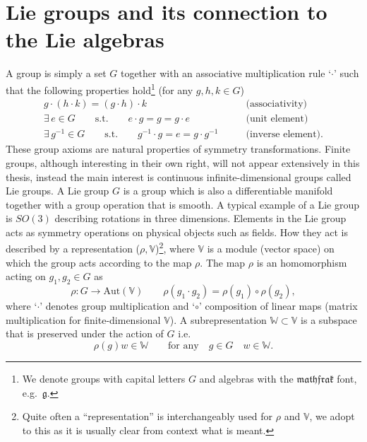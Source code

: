 \section{Lie groups and its connection to the Lie algebras}\label{sec:groups}
A group is simply a set $G$ together with an associative multiplication rule `$\cdot$' such that the following properties hold\footnote{We denote groups with capital letters $G$ and algebras with the $\mathfrak{mathfrak}$ font, e.g.\ $\mathfrak{g}$.} (for any $g,h,k\in G$)
\begin{align*}
    g\cdot \left(h\cdot k\right) = \left(g\cdot h\right)\cdot k \qquad &\text{(associativity)}\\
    \exists\, e \in G \qquad \text{s.t.} \qquad e\cdot g = g = g \cdot e\qquad &\text{(unit element)}\\
    \exists\, g^{-1}\in G\qquad \text{s.t.}\qquad g^{-1}\cdot g = e = g\cdot g^{-1} \qquad &\text{(inverse element)}.
\end{align*}
These group axioms are natural properties of symmetry transformations. Finite groups, although interesting in their own right, will not appear extensively in this thesis, instead the main interest is continuous infinite-dimensional groups called Lie groups. A Lie group $G$ is a group which is also a differentiable manifold together with a group operation that is smooth. A typical example of a Lie group is $SO(3)$ describing rotations in three dimensions. Elements in the Lie group acts as symmetry operations on physical objects such as fields. How they act is described by a representation ($\rho,\mathbb{V}$)\footnote{Quite often a ``representation'' is interchangeably used for $\rho$ and $\mathbb{V}$, we adopt to this as it is usually clear from context what is meant.}, where $\mathbb{V}$ is a module (vector space) on which the group acts according to the map $\rho$. The map $\rho$ is an homomorphism acting on $g_1,g_2\in G$ as
\begin{equation}
    \rho : G\to \text{Aut}(\mathbb{V}) \qquad \rho(g_1\cdot g_2) = \rho(g_1)\circ\rho(g_2),
\end{equation}
where `$\cdot$' denotes group multiplication and `$\circ$' composition of linear maps (matrix multiplication for finite-dimensional $\mathbb{V}$). A subrepresentation $\mathbb{W}\subset\mathbb{V}$ is a subspace that is preserved under the action of $G$ i.e.\
\begin{equation}
    \rho(g)w \in \mathbb{W} \qquad \text{for any} \quad g\in G\quad w\in\mathbb{W}.
\end{equation}

